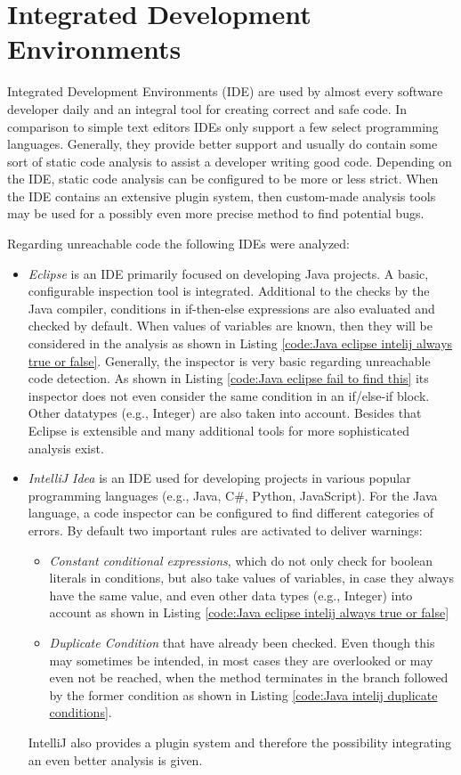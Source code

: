 \clearpage
\pagebreak
\section{Integrated Development Environments}
\label{sec:intelliJ}
Integrated Development Environments (IDE) are used by almost every software developer daily and an integral tool for creating correct and safe code.
In comparison to simple text editors IDEs only support a few select programming languages. Generally, they provide better support and usually do contain some sort of static code analysis to assist a developer writing good code. 
Depending on the IDE, static code analysis can be configured to be more or less strict. 
When the IDE contains an extensive plugin system, then custom-made analysis tools may be used for a possibly even more precise method to find potential bugs.


Regarding unreachable code the following IDEs were analyzed:
\begin{itemize}
	\item \emph{Eclipse} \cite{incCommunityOpenInnovation} is an IDE primarily focused on developing Java projects. A basic, configurable inspection tool is integrated. Additional to the checks by the Java compiler, conditions in if-then-else expressions are also evaluated and checked by default. When values of variables are known, then they will be considered in the analysis as shown in Listing \ref{code:Java eclipse intelij always true or false}. Generally, the inspector is very basic regarding unreachable code detection. As shown in Listing \ref{code:Java eclipse fail to find this} its inspector does not even consider the same condition in an if/else-if block. Other datatypes (e.g., Integer) are also taken into account. Besides that Eclipse is extensible and many additional tools for more sophisticated analysis exist.
	\item \emph{IntelliJ Idea} \cite{IntelliJIDEACapable} is an IDE used for developing projects in various popular programming languages (e.g., Java, C\#, Python, JavaScript). For the Java language, a code inspector can be configured to find different categories of errors. By default two important rules are activated to deliver warnings: 
	\begin{itemize}
		\item \emph{Constant conditional expressions}, which do not only check for boolean literals in conditions, but also take values of variables, in case they always have the same value, and even other data types (e.g., Integer) into account as shown in Listing \ref{code:Java eclipse intelij always true or false}
		\item \emph{Duplicate Condition} that have already been checked. Even though this may sometimes be intended, in most cases they are overlooked or may even not be reached, when the method terminates in the branch followed by the former condition as shown in Listing \ref{code:Java intelij duplicate conditions}. 
	\end{itemize}
	IntelliJ also provides a plugin system and therefore the possibility integrating an even better analysis is given.
\end{itemize}

